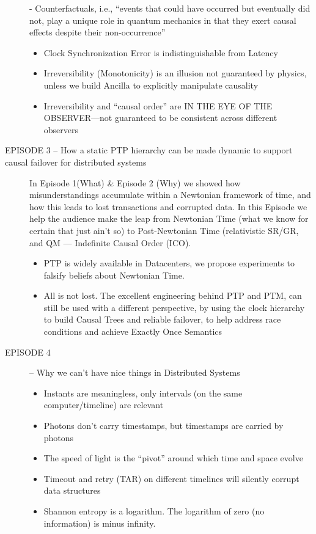 \documentclass[../HFT-main.tex]{subfiles}
\begin{document}
\begin{description}
- Counterfactuals, i.e., “events that could have occurred but eventually did not, play a unique role in quantum mechanics in that they exert causal effects despite their non-occurrence”
	\begin{itemize}
	\item  Clock Synchronization Error is indistinguishable from Latency
	\item  Irreversibility (Monotonicity) is an illusion not guaranteed by physics, unless we build Ancilla to explicitly manipulate causality
	\item  Irreversibility and “causal order” are IN THE EYE OF THE OBSERVER—not guaranteed to be consistent across different observers
	\end{itemize}
\item [EPISODE 3 -- How a static PTP hierarchy can be made dynamic to support causal failover for distributed systems]
In Episode 1(What) \& Episode 2 (Why) we showed how misunderstandings accumulate within a Newtonian framework of time, and how this leads to lost transactions and corrupted data. In this Episode we help the audience make the leap from Newtonian Time (what we know for certain that just ain’t so) to Post-Newtonian Time (relativistic SR/GR, and QM — Indefinite Causal Order (ICO).
	\begin{itemize}
	\item PTP is widely available in Datacenters, we propose experiments to falsify beliefs about Newtonian Time.
	\item All is not lost. The excellent engineering behind PTP and PTM, can still be used with a different perspective, by using the clock hierarchy to build Causal Trees and reliable failover, to help address race conditions and achieve Exactly Once Semantics
	\end{itemize}
\item [EPISODE 4] -- Why we can’t have nice things in Distributed Systems
	\begin{itemize}
	\item  Instants are meaningless, only intervals (on the same computer/timeline) are relevant
	\item  Photons don’t carry timestamps, but timestamps are carried by photons
	\item The speed of light is the ``pivot'' around which time and space evolve
	\item Timeout and retry (TAR) on different timelines will silently corrupt data structures
	\item  Shannon entropy is a logarithm. The logarithm of zero (no information) is minus infinity.

\end{itemize}
\end{description}
\end{document}

